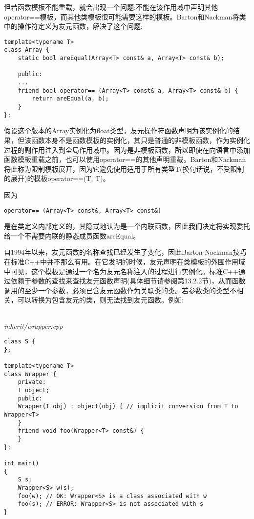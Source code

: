 但若函数模板不能重载，就会出现一个问题:不能在该作用域中声明其他operator==模板，而其他类模板很可能需要这样的模板。Barton和Nackman将类中的操作符定义为友元函数，解决了这个问题:

\begin{lstlisting}[style=styleCXX]
template<typename T>
class Array {
	static bool areEqual(Array<T> const& a, Array<T> const& b);
	
	public:
	...
	friend bool operator== (Array<T> const& a, Array<T> const& b) {
		return areEqual(a, b);
	}
};
\end{lstlisting}

假设这个版本的Array实例化为float类型，友元操作符函数声明为该实例化的结果，但该函数本身不是函数模板的实例化，其只是普通的非模板函数，作为实例化过程的副作用注入到全局作用域中。因为是非模板函数，所以即使在向语言中添加函数模板重载之前，也可以使用operator==的其他声明重载。Barton和Nackman将此称为限制模板展开，因为它避免使用适用于所有类型T(换句话说，不受限制的展开)的模板operator==(T, T)。

因为

\begin{lstlisting}[style=styleCXX]
operator== (Array<T> const&, Array<T> const&)
\end{lstlisting}

是在类定义内部定义的，其隐式地认为是一个内联函数，因此我们决定将实现委托给一个不需要内联的静态成员函数areEqual。

自1994年以来，友元函数的名称查找已经发生了变化，因此Barton-Nackman技巧在标准C++中并不那么有用。在它发明的时候，友元声明在类模板的外围作用域中可见，这个模板是通过一个名为友元名称注入的过程进行实例化。标准C++通过依赖于参数的查找来查找友元函数声明(具体细节请参阅第13.2.2节)，从而函数调用的至少一个参数，必须已含友元函数作为关联类的类。若参数类的类型不相关，可以转换为包含友元的类，则无法找到友元函数。例如:

\hspace*{\fill} \\ %
\noindent
\textit{inherit/wrapper.cpp}
\begin{lstlisting}[style=styleCXX]
class S {
};

template<typename T>
class Wrapper {
	private:
	T object;
	public:
	Wrapper(T obj) : object(obj) { // implicit conversion from T to Wrapper<T>
	}
	friend void foo(Wrapper<T> const&) {
	}
};

int main()
{
	S s;
	Wrapper<S> w(s);
	foo(w); // OK: Wrapper<S> is a class associated with w
	foo(s); // ERROR: Wrapper<S> is not associated with s
}
\end{lstlisting}

